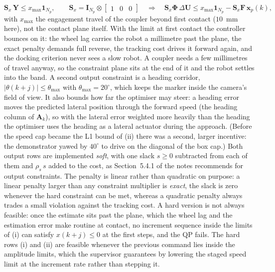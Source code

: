 \documentclass[11pt,a4paper]{article}
\newcommand{\vect}[1]{\bm{#1}}
\newcommand{\mat}[1]{\bm{#1}}
\newcommand{\dU}{\Delta\vect{U}}
\newcommand{\Np}{N_p}
\newcommand{\ones}{\vect{1}}
\begin{document}
\begin{description}[leftmargin=1.6em,style=nextline]
  \item[(iii) Outputs: no penetration beyond the coupler's engagement travel, and a heading corridor (soft).]
  \begin{equation}
  \mat S_x\,\vect Y\le x_{\max}\ones_{\Np},\qquad \mat S_x = \mat I_{\Np}\otimes\begin{bmatrix}1&0&0\end{bmatrix}
  \quad\Rightarrow\quad
  \mat S_x\mat\Phi\,\dU\le x_{\max}\ones_{\Np}-\mat S_x\mat F\,\vect x_p(k),
  \end{equation}
  with $x_{\max}$ the engagement travel of the coupler beyond first contact ($10$~mm here), not the contact plane itself. With the limit at first contact the controller bounces on it: the wheel lag carries the robot a millimetre past the plane, the exact penalty demands full reverse, the tracking cost drives it forward again, and the docking criterion never sees a slow robot. A coupler needs a few millimetres of travel anyway, so the constraint plane sits at the end of it and the robot settles into the band.
  A second output constraint is a heading corridor, $|\theta(k+j)|\le\theta_{\max}$ with $\theta_{\max}=20^\circ$, which keeps the marker inside the camera's field of view. It also bounds how far the optimiser may steer: a heading error moves the predicted lateral position through the forward speed (the heading column of $\mat A_k$), so with the lateral error weighted more heavily than the heading the optimiser uses the heading as a lateral actuator during the approach. (Before the speed cap became the L1 bound of (ii) there was a second, larger incentive: the demonstrator yawed by $40^\circ$ to drive on the diagonal of the box cap.) Both output rows are implemented \emph{soft}, with one slack $s\ge 0$ subtracted from each of them and $\rho_s\,s$ added to the cost, as Section~5.4.1 of the notes recommends for output constraints. The penalty is linear rather than quadratic on purpose: a linear penalty larger than any constraint multiplier is \emph{exact}, the slack is zero whenever the hard constraint can be met, whereas a quadratic penalty always trades a small violation against the tracking cost. A hard version is not always feasible: once the estimate sits past the plane, which the wheel lag and the estimation error make routine at contact, no increment sequence inside the limits of (i) can satisfy $x(k+j)\le 0$ at the first steps, and the QP fails. The hard rows (i) and (ii) are feasible whenever the previous command lies inside the amplitude limits, which the supervisor guarantees by lowering the staged speed limit at the increment rate rather than stepping it.
\end{description}
\end{document}
